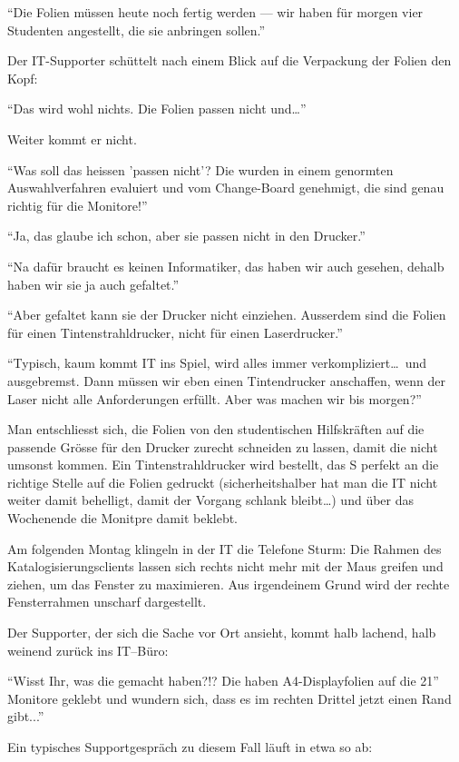 \documentclass[german,headsepline]{scrartcl}
\begin{document}
``Die Folien müssen heute noch fertig werden --- wir haben für morgen 
vier Studenten angestellt, die sie anbringen sollen.''

Der IT-Supporter schüttelt nach einem Blick auf die Verpackung der Folien den Kopf: 

``Das wird wohl nichts. Die Folien passen nicht und\ldots''

Weiter kommt er nicht. 

``Was soll das heissen 'passen nicht'? Die wurden in einem genormten Auswahlverfahren evaluiert und vom Change-Board genehmigt, die sind genau richtig für die Monitore!''

``Ja, das glaube ich schon, aber sie passen nicht in den Drucker.''

``Na dafür braucht es keinen Informatiker, das haben wir auch gesehen, dehalb haben wir sie ja auch gefaltet.''

``Aber gefaltet kann sie der Drucker nicht einziehen. Ausserdem sind die Folien für einen Tintenstrahldrucker, nicht für einen Laserdrucker.''

``Typisch, kaum kommt IT ins Spiel, wird alles immer verkompliziert\ldots\ und ausgebremst. Dann müssen wir eben einen Tintendrucker anschaffen, wenn der Laser nicht alle Anforderungen erfüllt. Aber was machen wir bis morgen?''

Man entschliesst sich, die Folien von den studentischen Hilfskräften auf die passende Grösse für den Drucker zurecht schneiden zu lassen, damit die nicht umsonst kommen. Ein Tintenstrahldrucker wird bestellt, das S perfekt an die richtige Stelle auf die Folien gedruckt (sicherheitshalber hat man die IT nicht weiter damit behelligt, damit der Vorgang schlank bleibt\ldots) und über das Wochenende die Monitpre damit beklebt.

Am folgenden Montag klingeln in der IT die Telefone Sturm: Die Rahmen des Katalogisierungsclients lassen sich rechts nicht mehr mit der Maus greifen und ziehen, um das Fenster zu maximieren. Aus irgendeinem Grund wird der rechte Fensterrahmen unscharf dargestellt.

Der Supporter, der sich die Sache vor Ort ansieht, kommt halb lachend, halb weinend zurück ins IT--Büro:

``Wisst Ihr, was die gemacht haben?!? Die haben A4-Displayfolien auf die 21” Monitore geklebt und wundern sich, dass es im rechten Drittel jetzt einen Rand gibt...''

Ein typisches Supportgespräch zu diesem Fall läuft in etwa so ab: 
\end{document}
